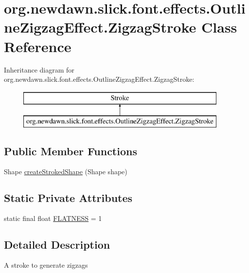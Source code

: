 \hypertarget{classorg_1_1newdawn_1_1slick_1_1font_1_1effects_1_1_outline_zigzag_effect_1_1_zigzag_stroke}{}\section{org.\+newdawn.\+slick.\+font.\+effects.\+Outline\+Zigzag\+Effect.\+Zigzag\+Stroke Class Reference}
\label{classorg_1_1newdawn_1_1slick_1_1font_1_1effects_1_1_outline_zigzag_effect_1_1_zigzag_stroke}
Inheritance diagram for org.\+newdawn.\+slick.\+font.\+effects.\+Outline\+Zigzag\+Effect.\+Zigzag\+Stroke\+:\begin{figure}[H]
\begin{center}
\leavevmode
\includegraphics[height=2.000000cm]{classorg_1_1newdawn_1_1slick_1_1font_1_1effects_1_1_outline_zigzag_effect_1_1_zigzag_stroke}
\end{center}
\end{figure}
\subsection*{Public Member Functions}
\begin{DoxyCompactItemize}
\item 
Shape \mbox{\hyperlink{classorg_1_1newdawn_1_1slick_1_1font_1_1effects_1_1_outline_zigzag_effect_1_1_zigzag_stroke_ac2e21e3dd033f15dfd89bea3dc6ff337}{create\+Stroked\+Shape}} (Shape shape)
\end{DoxyCompactItemize}
\subsection*{Static Private Attributes}
\begin{DoxyCompactItemize}
\item 
static final float \mbox{\hyperlink{classorg_1_1newdawn_1_1slick_1_1font_1_1effects_1_1_outline_zigzag_effect_1_1_zigzag_stroke_a23a03ec9f7b08b39400967cb8ad91582}{F\+L\+A\+T\+N\+E\+SS}} = 1
\end{DoxyCompactItemize}


\subsection{Detailed Description}
A stroke to generate zigzags

